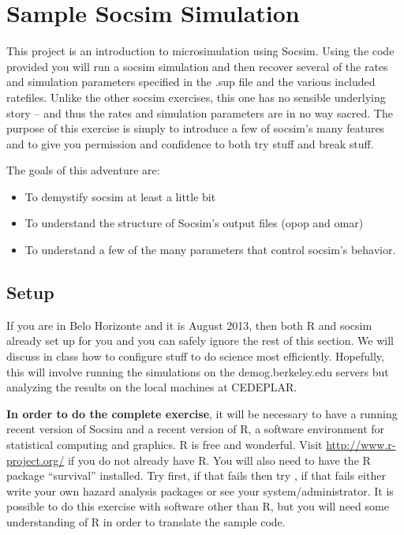 
\date{2013}
\maketitle
\section{Sample Socsim Simulation}

This project is an introduction to microsimulation using Socsim. Using
the code provided you will run a socsim simulation and then recover
several of the rates and simulation parameters specified in the .sup
file and the various included ratefiles. Unlike the other socsim
exercises, this one has no sensible underlying story -- and thus the
rates and simulation parameters are in no way sacred.  The purpose of
this exercise  is
simply to introduce a few of socsim's many features and to give you
permission and confidence to both try stuff and break stuff.


The goals of this adventure are:
\begin{itemize}

\item To demystify socsim at least a little bit
\item To understand the structure of Socsim's output files (opop and omar)
\item To understand a few of the many parameters that control socsim's behavior.

\end{itemize}

\subsection{Setup}
\label{Setup}

If you are in Belo Horizonte and it is August 2013, then both R and
socsim already set up for you and you can safely ignore the rest of
this section.   We will discuss in class how
to configure stuff to do science most efficiently.  Hopefully, this
will involve running the simulations on the demog.berkeley.edu servers
but analyzing the results on the local machines at CEDEPLAR.  


\textbf{In order to do the complete exercise}, it will be necessary to
have a running recent version of Socsim and a recent version of R, a
software environment for statistical computing and graphics. R is free
and wonderful.  Visit \url{http://www.r-project.org/} if you do not
already have R.  You will also need to have the R package ``survival''
installed. Try  first, if that fails then try
, if that fails either write your own
hazard analysis packages or see your system/administrator.  It is
possible to do this exercise with software other than R, but you will
need some understanding of R in order to translate the sample code.



